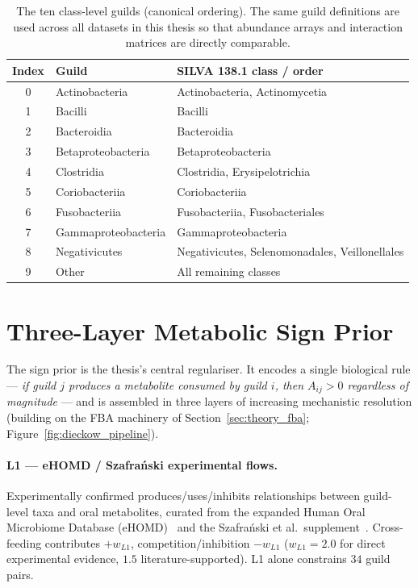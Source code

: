 \begin{table}[htbp]
  \centering\small
  \begin{tabular}{@{}cll@{}}
    \toprule
    \textbf{Index} & \textbf{Guild} & \textbf{SILVA 138.1 class / order}\\
    \midrule
    0 & Actinobacteria      & Actinobacteria, Actinomycetia\\
    1 & Bacilli             & Bacilli\\
    2 & Bacteroidia         & Bacteroidia\\
    3 & Betaproteobacteria  & Betaproteobacteria\\
    4 & Clostridia          & Clostridia, Erysipelotrichia\\
    5 & Coriobacteriia      & Coriobacteriia\\
    6 & Fusobacteriia       & Fusobacteriia, Fusobacteriales\\
    7 & Gammaproteobacteria & Gammaproteobacteria\\
    8 & Negativicutes       & Negativicutes, Selenomonadales, Veillonellales\\
    9 & Other               & All remaining classes\\
    \bottomrule
  \end{tabular}
  \caption[Ten class-level guilds]{The ten class-level guilds (canonical
  ordering). The same guild definitions are used across all datasets in this
  thesis so that abundance arrays and interaction matrices are directly comparable.}
  \label{tab:dieckow_guilds}
\end{table}

\section{Three-Layer Metabolic Sign Prior}
\label{sec:dieckow_prior}

The sign prior is the thesis's central regulariser. It encodes a single biological
rule --- \emph{if guild $j$ produces a metabolite consumed by guild $i$, then
$A_{ij}>0$ regardless of magnitude} --- and is assembled in three layers of
increasing mechanistic resolution (building on the FBA machinery of
Section~\ref{sec:theory_fba}; Figure~\ref{fig:dieckow_pipeline}).

\paragraph{L1 --- eHOMD / Szafra\'{n}ski experimental flows.} Experimentally
confirmed produces/uses/inhibits relationships between guild-level taxa and oral
metabolites, curated from the expanded Human Oral Microbiome Database
(eHOMD)~\cite{Escapa2018eHOMD} and the Szafra\'{n}ski et al.\ supplement~\cite{Szafranski2025}. Cross-feeding
contributes $+w_{L1}$, competition/inhibition $-w_{L1}$ ($w_{L1}=2.0$ for direct
experimental evidence, $1.5$ literature-supported). L1 alone constrains $34$ guild
pairs.


